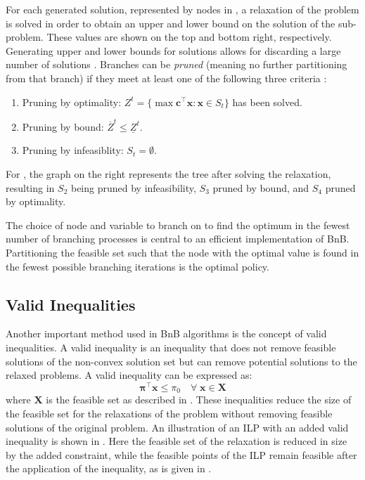 For each generated solution, represented by nodes in , a relaxation of the problem is solved in order to obtain an upper and lower bound on the solution of the sub-problem. 
These values are shown on the top and bottom right, respectively. 
Generating upper and lower bounds for solutions allows for discarding a large number of solutions \cite{wolsey2020integer}. Branches can be \textit{pruned} (meaning no further partitioning from that branch) if they meet at least one of the following three criteria \cite{wolsey2020integer}:
\newpage
\begin{enumerate}[label=(\roman*)]
    \item Pruning by optimality: $Z^t = \{\max \bm{c}^{\top} \bm{x} : \bm{x} \in S_t\}$ has been solved.
    \item Pruning by bound: $\overline{Z}^t \leq \underline{Z}^t$.
    \item Pruning by infeasiblity: $S_t = \emptyset $.
\end{enumerate}
For , the graph on the right represents the tree after solving the relaxation, resulting in $S_2$ being pruned by infeasibility, $S_3$ pruned by bound, and $S_4$ pruned by optimality.


The choice of node and variable to branch on to find the optimum in the fewest number of branching processes is central to an efficient implementation of \gls{BnB}. Partitioning the feasible set such that the node with the optimal value is found in the fewest possible branching iterations is the optimal policy. 


\subsection{Valid Inequalities}\label{ssec:inequalities}

Another important method used in \gls{BnB} algorithms is the concept of valid inequalities. A valid inequality is an inequality that does not remove feasible solutions of the non-convex solution set but can remove potential solutions to the relaxed problems. A valid inequality can be expressed as:
\begin{equation}\label{eq:cut}
    \mathbf{\pi}^{\top} \mathbf{x} \leq \pi_0 \quad \forall \; \mathbf{x} \in  \bm{X}   
\end{equation}
where $\bm{X}$ is the feasible set as described in . These inequalities reduce the size of the feasible set for the relaxations of the problem without removing feasible solutions of the original problem. An illustration of an \gls{ILP} with an added valid inequality is shown in . Here the feasible set of the relaxation is reduced in size by the added constraint, while the feasible points of the \gls{ILP} remain feasible after the application of the inequality, as is given in .

